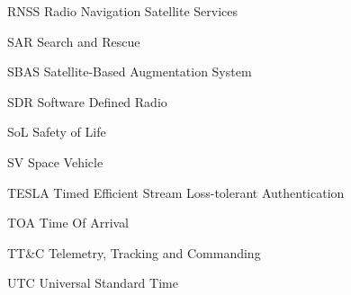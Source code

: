 \begin{abbreviations}
\item[RNSS] Radio Navigation Satellite Services
\item[SAR] Search and Rescue
\item[SBAS] Satellite-Based Augmentation System
\item[SDR] Software Defined Radio
\item[SoL] Safety of Life
\item[SV] Space Vehicle
\item[TESLA] Timed Efficient Stream Loss-tolerant Authentication
\item[TOA] Time Of Arrival
\item[TT&C] Telemetry, Tracking and Commanding
\item[UTC] Universal Standard Time

\end{abbreviations}
